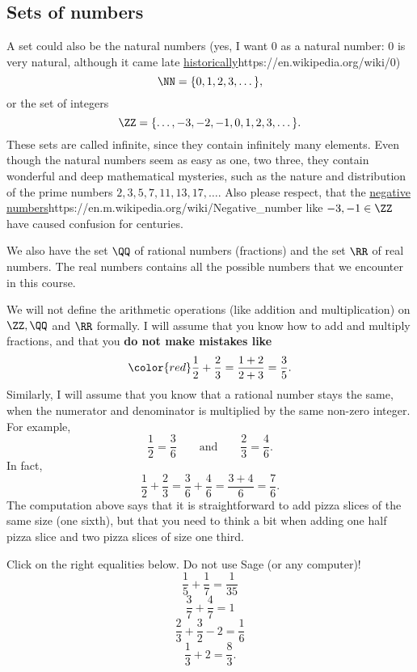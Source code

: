 \documentclass{article}
\begin{document}
\subsection{Sets of numbers}

A set could also be the natural numbers (yes, I want $0$ as a natural number:
$0$ is very natural, although it came late \url{historically}{https://en.wikipedia.org/wiki/0})
$$
\NN = \{0, 1, 2, 3, \dots\},
$$
or the set of integers
$$
\ZZ = \{\dots, -3, -2, -1, 0, 1, 2, 3, \dots\}.
$$
These sets are called infinite, since they contain infinitely many elements. Even though
the natural numbers seem as easy as one, two three, they contain wonderful and deep
mathematical mysteries, such as the nature and distribution of the prime numbers
$2, 3, 5, 7, 11, 13, 17, \dots$. Also please respect, that the \url{negative numbers}{https://en.m.wikipedia.org/wiki/Negative_number} like
$-3, -1\in \ZZ$ have caused confusion for centuries.
 
We also have
the set $\QQ$ of rational numbers (fractions) and the set
$\RR$ of real numbers. The real numbers
contains all the possible numbers that we encounter in 
this course.

We will not define the
arithmetic operations (like addition and multiplication) on $\ZZ, \QQ$
and $\RR$ 
formally. I will assume that you know how to add and multiply fractions,
and that you \textbf{do not make mistakes like}
$$
\color{red}
\frac{1}{2} + \frac{2}{3} = \frac{1+2}{2+3}=\frac{3}{5}.
$$
Similarly, I will assume that you know that a rational number stays the
same, when the numerator and denominator is multiplied by the same non-zero 
integer. For example,
$$
\frac{1}{2} = \frac{3}{6}\qquad\text{and}\qquad \frac{2}{3} = \frac{4}{6}.
$$
In fact, 
$$
\frac{1}{2} + \frac{2}{3} = \frac{3}{6} + \frac{4}{6} = \frac{3 + 4}{6} = \frac{7}{6}.
$$
The computation above says that it is straightforward to add pizza slices of the
same size (one sixth), but that you need to think a bit when adding one half pizza slice and
two pizza slices of size one third.




\begin{quizexercise}[showhide]
  \begin{quiz}
\question
Click on the right equalities below. Do not use Sage (or any computer)!
$$
\frac{1}{5} + \frac{1}{7} = \frac{1}{35}
$$
$$
\frac{3}{7} + \frac{4}{7} = 1
$$
$$
\frac{2}{3} + \frac{3}{2} - 2 = \frac{1}{6}
$$
$$
\frac{1}{3} + 2 = \frac{8}{3}.
$$
\end{quiz}
\end{quizexercise}
\end{document}
